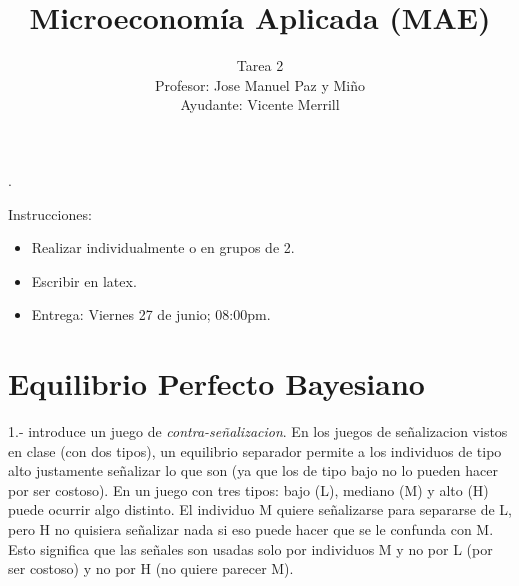 \documentclass[11pt]{article}
\title{Microeconom\'ia Aplicada (MAE)}
\author{Tarea 2 \\ Profesor: Jose Manuel Paz y Mi\~no \\ Ayudante: Vicente Merrill}
\date{}
\newcommand{\blankline}{\quad\pagebreak[2]}
\begin{document}
\maketitle

\blankline

\setlength{\parindent}{0pt}.

Instrucciones:
\begin{itemize}
	\item Realizar individualmente o en grupos de 2.
	\item Escribir en latex.
	\item Entrega: Viernes 27 de junio; 08:00pm.
\end{itemize}


\section*{Equilibrio Perfecto Bayesiano}

1.- \cite{feltovich2002too} introduce un juego de \textit{contra-se\~nalizacion}. En los juegos de se\~nalizacion vistos en clase (con dos tipos), un equilibrio separador permite a los individuos de tipo alto justamente se\~nalizar lo que son (ya que los de tipo bajo no lo pueden hacer por ser costoso). En un juego con tres tipos: bajo (L), mediano (M) y alto (H) puede ocurrir algo distinto. El individuo M quiere se\~nalizarse para separarse de L, pero H no quisiera se\~nalizar nada si eso puede hacer que se le confunda con M. Esto significa que las se\~nales son usadas solo por individuos M y no por L (por ser costoso) y no por H (no quiere parecer M).\\
\end{document}
